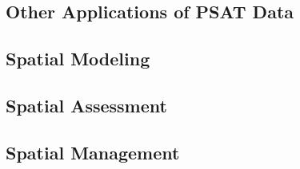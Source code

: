 \documentclass[11pt]{article}
\begin{document}
\subsection{Other Applications of PSAT Data}

\subsection{Spatial Modeling}

\subsection{Spatial Assessment}

\subsection{Spatial Management}































\newpage
\end{document}
